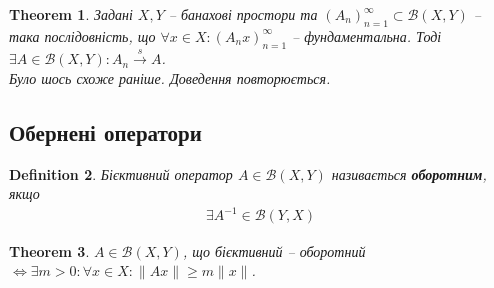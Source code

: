 \documentclass[a4paper, 10pt]{article}
\makeatletter
\def\rightproof{$\boxed{\Rightarrow}$ }
\theoremstyle{theoremdd}
\newtheorem{theorem}{Theorem}[subsection]
\theoremstyle{theoremdd}
\newtheorem{definition}[theorem]{Definition}
\theoremstyle{theoremdd}
\theoremstyle{theoremdd}
\theoremstyle{theoremdd}
\theoremstyle{theoremdd}
\theoremstyle{theoremdd}
\theoremstyle{theoremdd}
\newcommand{\toweak}{\overset{w}{\to}}
\newcommand{\tostrong}{\overset{s}{\to}}
\renewenvironment{proof}[1][Proof.\\]{\par
\pushQED{\hfill \qed}%
\normalfont \topsep6\p@\@plus6\p@\relax
\trivlist
\item\relax
{\bfseries
#1\@addpunct{.}}\hspace\labelsep\ignorespaces
}{%
\popQED\endtrivlist\@endpefalse
}
\makeatother
\begin{document}
\begin{theorem}
Задані $X,Y$ -- банахові простори та $(A_n)_{n=1}^\infty \subset \mathcal{B}(X,Y)$ -- така послідовність, що $\forall x \in X: (A_n x)_{n=1}^\infty$ -- фундаментальна. Тоді $\exists A \in \mathcal{B}(X,Y): A_n \tostrong A$.\\
\textit{Було шось схоже раніше. Доведення повторюється.}
\end{theorem}

\iffalse
\begin{theorem}
Розглянемо простір $C([0,1])$.\\
$f_n \toweak f \iff \begin{cases} \forall t \in [0,1]: f_n(t) \to f(t) \\ \|f_n\| \leq M,\ M > 0 \end{cases}$.
\end{theorem}

\begin{proof}
\rightproof Дано: $f_n \toweak f$. Розглянемо будь-яку точку $t_0 \in [0,1]$, а згодом оберемо функцію $g(t) = \begin{cases} 0, & x \leq t_0 \\ 1, & x > t_0 \end{cases}$. Тоді зауважимо, що $\displaystyle\int_0^1 f_n(t) - f(t)\,dg(t) = f_n(t) - f(t_0)$ (обчислення інтеграла Стілтьєса). Такому інтегралу відповідає функціонал $l \in (C([0,1]))'$. За умовою, $l(f_n) \to l(f)$, тобто $|l(f_n) - l(f)| = \displaystyle\left| \int_0^1 f_n(t) - f(t)\,dg(t)  \right| = |f_n(t_0) - f(t_0)| \to 0 \implies f_n(t_0) \to f(t_0)$.ґґ
Оскільки $($
\end{proof}
\fi

\subsection{Обернені оператори}
\begin{definition}
Бієктивний оператор $A \in \mathcal{B}(X,Y)$ називається \textbf{оборотним}, якщо
\begin{align*}
\exists A^{-1} \in \mathcal{B}(Y,X)
\end{align*}
\end{definition}

\begin{theorem}
$A \in \mathcal{B}(X,Y)$, що бієктивний -- оборотний $\iff \exists m > 0: \forall x \in X: \|Ax\| \geq m\|x\|$.
\end{theorem}
\end{document}
